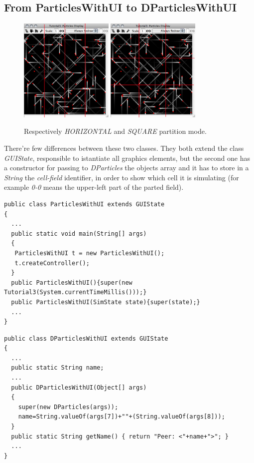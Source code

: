 \documentclass[12pt]{article}
\begin{document}
\subsection{From ParticlesWithUI to DParticlesWithUI}
\begin{figure}
	\centering
		\includegraphics[width=0.4\textwidth]{particles-h.png}	
		\includegraphics[width=0.4\textwidth]{particles-m.png}
		\caption{Respectively \textit{HORIZONTAL} and \textit{SQUARE} partition mode.}
	\label{fig:dp01}
\end{figure}
There're few differences between these two classes. They both extend the class \textit{GUIState}, responsible to istantiate all graphics elements, but the second one has a constructor for passing to \textit{DParticles} the objects array and it has to store in a \textit{String} the \textit{cell-field} identifier, in order to show which cell it is simulating (for example \textit{0-0} means the upper-left part of the parted field).
\begin{lstlisting}
public class ParticlesWithUI extends GUIState
{
  ...
  public static void main(String[] args)
  {
   ParticlesWithUI t = new ParticlesWithUI();
   t.createController();
  }
  public ParticlesWithUI(){super(new Tutorial3(System.currentTimeMillis()));}
  public ParticlesWithUI(SimState state){super(state);}
  ...
}
\end{lstlisting}
\medskip
{}
\begin{lstlisting}
public class DParticlesWithUI extends GUIState
{
  ...
  public static String name;
  ...
  public DParticlesWithUI(Object[] args)
  {
    super(new DParticles(args));
    name=String.valueOf(args[7])+""+(String.valueOf(args[8]));
  }
  public static String getName() { return "Peer: <"+name+">"; }
  ...
}

\end{lstlisting}
\end{document}
